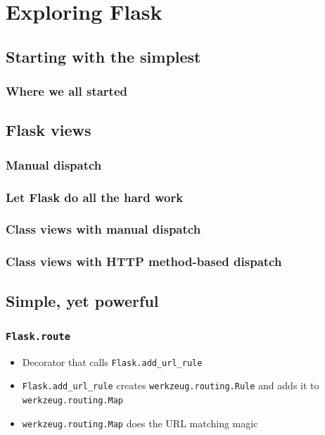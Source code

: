 \documentclass[14pt]{beamer}
\begin{document}
\section{Exploring Flask}

\subsection{Starting with the simplest}

\begin{frame}[fragile]
  \frametitle{Where we all started}
\end{frame}

\subsection{Flask views}

\begin{frame}
  \frametitle{Manual dispatch}
  
\end{frame}

\begin{frame}
  \frametitle{Let Flask do all the hard work}
  
\end{frame}

\begin{frame}
  \frametitle{Class views with manual dispatch}
  
\end{frame}

\begin{frame}
  \frametitle{Class views with HTTP method-based dispatch}
  
\end{frame}

\subsection{Simple, yet powerful}

\begin{frame}
  \frametitle{\texttt{Flask.route}}
  \begin{itemize}
  \item Decorator that calls \texttt{Flask.add\_url\_rule}
  \item \texttt{Flask.add\_url\_rule} creates \texttt{werkzeug.routing.Rule}
    and adds it to \texttt{werkzeug.routing.Map}
  \item \texttt{werkzeug.routing.Map} does the URL matching magic
  \end{itemize}
\end{frame}
\end{document}
